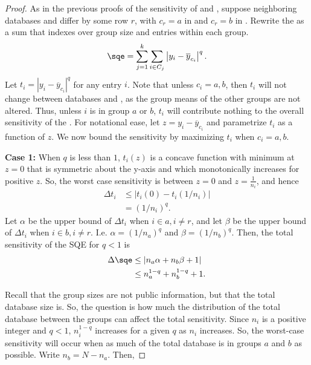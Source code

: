 \begin{proof}
As in the previous proofs of the sensitivity of \se and \sa, suppose neighboring databases \x and \xprime differ by some row $r$, with $c_r = a$ in \x and $c_r = b$ in \xprime. Rewrite the \sqe as a sum that indexes over group size and entries within each group.
%
$$\sqe = \sum_{j=1}^k \sum_{i \in C_j} \left\vert  y_i - \overline{y}_{c_i} \right\vert^q.$$
%
Let $t_i =  \left\vert y_{i} - \overline{y}_{c_i} \right\vert ^q$ for any entry $i$.  Note that unless $c_i = a,b$, then $t_i$ will not change between databases \x and \xprime, as the group means of the other groups are not altered. Thus, unless $i$ is in group $a$ or $b$, $t_i$ will contribute nothing to the overall sensitivity of the \sqe. For notational ease, let $z = y_i-\overline{y}_{c_i}$ and parametrize $t_i$ as a function of $z$. We now bound the sensitivity by maximizing $t_i$ when $c_i = a,b$.

\noindent\textbf{Case 1:}
When $q$ is less than $1$, $t_i(z)$ is a concave function with minimum at $z=0$ that is symmetric about the y-axis and which monotonically increases for positive $z$. So, the worst case sensitivity is between $z = 0$ and $z = \frac{1}{n_i}$, and hence
%
\begin{align*}
\Delta t_{i} &\le \left\vert t_i(0) - t_i(1/n_i) \right\vert \\
	&= (1/n_i)^q.
\end{align*}
%
Let $\alpha$ be the upper bound of $\Delta t_i$ when $i \in a, i \ne r$, and let $\beta$ be the upper bound of $\Delta t_i$ when $i \in b, i \ne r$. I.e. $\alpha = (1/n_a)^q$ and $\beta = (1/n_b)^q$.  Then, the total sensitivity of the SQE for $q<1$ is
%
\begin{align*}
\Delta \sqe &\le \left\vert n_a \alpha + n_b \beta + 1 \right\vert \\
	&\le n_a^{1-q} + n_b^{1-q} + 1.
\end{align*}

Recall that the group sizes are not public information, but that the total database size is. So, the question is how much the distribution of the total database between the groups can affect the total sensitivity. Since $n_i$ is a positive integer and $q<1$, $n_i^{1-q}$ increases for a given $q$ as $n_i$ increases. So, the worst-case sensitivity will occur when as much of the total database is in groups $a$ and $b$ as possible. Write $n_b = N-n_a$. Then,


\end{proof}
